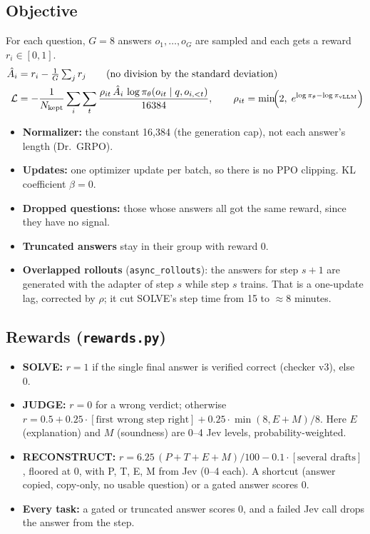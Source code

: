 \documentclass[10pt,a4paper]{article}
\begin{document}
\subsection{Objective}
For each question, $G=8$ answers $o_1,\dots,o_G$ are sampled and each gets a reward $r_i\in[0,1]$.
\begin{align}
\hat A_i &= r_i - \tfrac1G\textstyle\sum_{j} r_j \qquad\text{(no division by the standard deviation)}\\
\mathcal L &= -\frac{1}{N_{\text{kept}}}\sum_{i}\sum_{t}\frac{\rho_{it}\,\hat A_i\,\log\pi_\theta(o_{it}\mid q,o_{i,<t})}{16384},
\qquad \rho_{it}=\min\!\Bigl(2,\;e^{\log\pi_\theta-\log\pi_{\text{vLLM}}}\Bigr)
\end{align}
\begin{itemize}
\item \textbf{Normalizer:} the constant 16,384 (the generation cap), not each answer's length (Dr.~GRPO).
\item \textbf{Updates:} one optimizer update per batch, so there is no PPO clipping. KL coefficient $\beta=0$.
\item \textbf{Dropped questions:} those whose answers all got the same reward, since they have no signal.
\item \textbf{Truncated answers} stay in their group with reward 0.
\item \textbf{Overlapped rollouts} (\texttt{async\_rollouts}): the answers for step $s{+}1$ are generated with the
      adapter of step $s$ while step $s$ trains. That is a one-update lag, corrected by $\rho$; it cut SOLVE's step
      time from 15 to $\approx$8 minutes.
\end{itemize}

\subsection{Rewards (\texttt{rewards.py})}
\begin{itemize}
\item \textbf{SOLVE:} $r=1$ if the single final answer is verified correct (checker v3), else 0.
\item \textbf{JUDGE:} $r=0$ for a wrong verdict; otherwise $r = 0.5 + 0.25\cdot[\text{first wrong step right}] +
      0.25\cdot\min(8,E+M)/8$. Here $E$ (explanation) and $M$ (soundness) are 0--4 Jev levels, probability-weighted.
\item \textbf{RECONSTRUCT:} $r = 6.25\,(P+T+E+M)/100 - 0.1\cdot[\text{several drafts}]$, floored at 0, with P, T, E,
      M from Jev (0--4 each). A shortcut (answer copied, copy-only, no usable question) or a gated answer scores 0.
\item \textbf{Every task:} a gated or truncated answer scores 0, and a failed Jev call drops the answer from the step.
\end{itemize}
\end{document}
